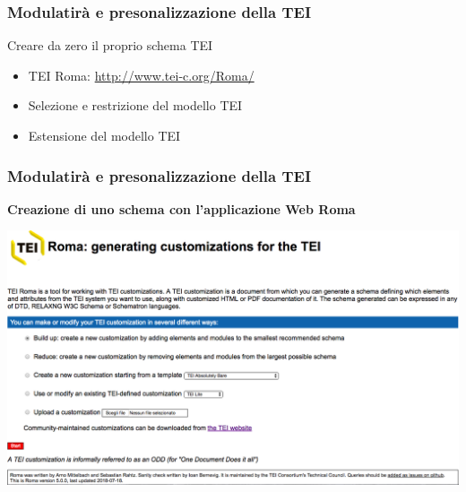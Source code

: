     \begin{frame}
        \frametitle{Modulatirà e presonalizzazione della TEI}
        \addtocounter{nframe}{1}

        \begin{block}{Creare da zero il proprio schema TEI}
                \begin{itemize}
                    \item TEI Roma: \url{http://www.tei-c.org/Roma/}
                    \item Selezione e restrizione del modello TEI
                    \item Estensione del modello TEI
                \end{itemize} 
        \end{block}
        
    \end{frame}

    \begin{frame}
        \frametitle{Modulatirà e presonalizzazione della TEI}
        \addtocounter{nframe}{1}
        
        \textbf{Creazione di uno schema con l'applicazione Web Roma}

         \begin{center}
            \includegraphics[width=.95\textwidth]{imgs/Roma1.png}
         \end{center}
       
        
    \end{frame}

